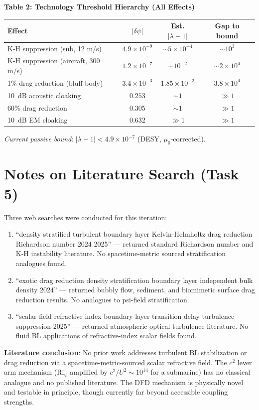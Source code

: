 \documentclass[11pt,twocolumn]{article}
\newcommand{\dpsi}{\delta\psi}
\newcommand{\lam}{\lambda}
\begin{document}
\begin{center}
\textbf{Table 2: Technology Threshold Hierarchy (All Effects)}
\vspace{0.5em}

\begin{tabular}{@{}lccc@{}}
\toprule
\textbf{Effect} & $|\dpsi|$ & Est. $|\lam-1|$ & Gap to bound \\
\midrule
K-H suppression (sub, 12 m/s) & $4.9\times10^{-9}$ & $\sim 5\times10^{-4}$
  & $\sim 10^3$ \\
K-H suppression (aircraft, 300 m/s) & $1.2\times10^{-7}$ & $\sim 10^{-2}$
  & $\sim 2\times10^4$ \\
1\% drag reduction (bluff body) & $3.4\times10^{-3}$ & $1.85\times10^{-2}$
  & $3.8\times10^4$ \\
10~dB acoustic cloaking & $0.253$ & $\sim 1$ & $\gg 1$ \\
60\% drag reduction & $0.305$ & $\sim 1$ & $\gg 1$ \\
10~dB EM cloaking & $0.632$ & $\gg 1$ & $\gg 1$ \\
\bottomrule
\end{tabular}
\end{center}

\vspace{0.5em}
\noindent\textit{Current passive bound}: $|\lam-1| < 4.9\times10^{-7}$ (DESY, $\mu_0$-corrected).

\section*{Notes on Literature Search (Task 5)}

Three web searches were conducted for this iteration:
\begin{enumerate}[nosep]
\item ``density stratified turbulent boundary layer Kelvin-Helmholtz drag
  reduction Richardson number 2024 2025'' --- returned standard Richardson
  number and K-H instability literature. No spacetime-metric sourced
  stratification analogues found.
\item ``exotic drag reduction density stratification boundary layer
  independent bulk density 2024'' --- returned bubbly flow, sediment, and
  biomimetic surface drag reduction results. No analogues to psi-field
  stratification.
\item ``scalar field refractive index boundary layer transition delay
  turbulence suppression 2025'' --- returned atmospheric optical turbulence
  literature. No fluid BL applications of refractive-index scalar fields
  found.
\end{enumerate}

\noindent\textbf{Literature conclusion}: No prior work addresses turbulent BL
stabilization or drag reduction via a spacetime-metric-sourced scalar
refractive field. The $c^2$ lever arm mechanism (Ri$_\psi$ amplified by
$c^2/U^2 \sim 10^{14}$ for a submarine) has no classical analogue and no
published literature. The DFD mechanism is physically novel and testable in
principle, though currently far beyond accessible coupling strengths.
\end{document}
